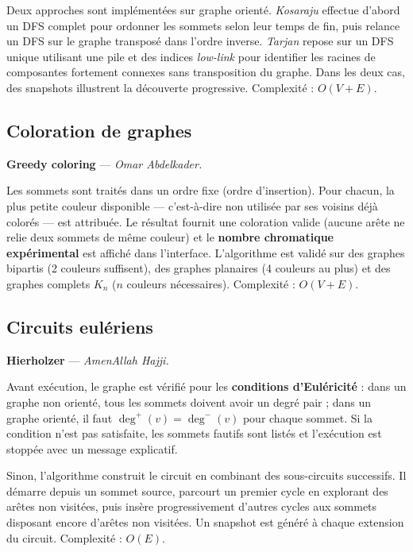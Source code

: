 \documentclass[a4paper,12pt]{report}
\begin{document}
Deux approches sont implémentées sur graphe orienté. \textit{Kosaraju} effectue d'abord un DFS
complet pour ordonner les sommets selon leur temps de fin, puis relance un DFS sur le graphe
transposé dans l'ordre inverse. \textit{Tarjan} repose sur un DFS unique utilisant une pile
et des indices \textit{low-link} pour identifier les racines de composantes fortement connexes
sans transposition du graphe. Dans les deux cas, des snapshots illustrent la découverte progressive.
Complexité : $O(V+E)$.


\subsection{Coloration de graphes}

\textbf{Greedy coloring} — \textit{Omar Abdelkader.}

Les sommets sont traités dans un ordre fixe (ordre d'insertion). Pour chacun, la plus petite
couleur disponible — c'est-à-dire non utilisée par ses voisins déjà colorés — est attribuée.
Le résultat fournit une coloration valide (aucune arête ne relie deux sommets de même couleur)
et le \textbf{nombre chromatique expérimental} est affiché dans l'interface. L'algorithme est
validé sur des graphes bipartis (2 couleurs suffisent), des graphes planaires (4 couleurs au
plus) et des graphes complets $K_n$ ($n$ couleurs nécessaires). Complexité : $O(V + E)$.


\subsection{Circuits eulériens}

\textbf{Hierholzer} — \textit{AmenAllah Hajji.}

Avant exécution, le graphe est vérifié pour les \textbf{conditions d'Euléricité} :
dans un graphe non orienté, tous les sommets doivent avoir un degré pair ;
dans un graphe orienté, il faut $\deg^+(v) = \deg^-(v)$ pour chaque sommet.
Si la condition n'est pas satisfaite, les sommets fautifs sont listés et l'exécution est stoppée
avec un message explicatif.

Sinon, l'algorithme construit le circuit en combinant des sous-circuits successifs.
Il démarre depuis un sommet source, parcourt un premier cycle en explorant des arêtes non visitées,
puis insère progressivement d'autres cycles aux sommets disposant encore d'arêtes non visitées.
Un snapshot est généré à chaque extension du circuit. Complexité : $O(E)$.
\end{document}
